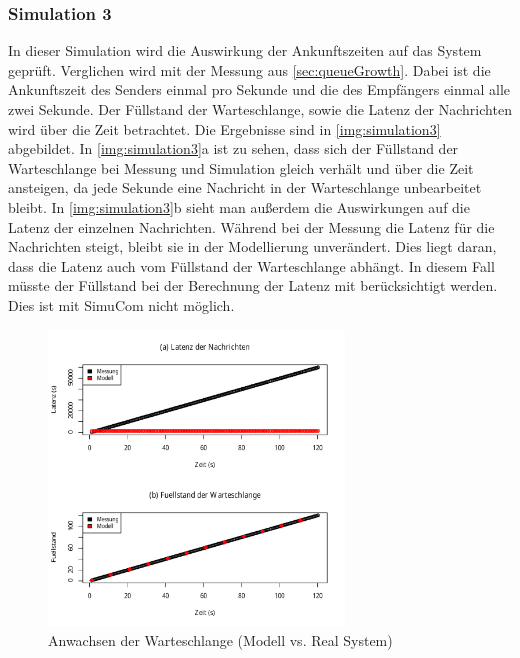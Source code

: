 \subsubsection{Simulation 3}
\label{sec:simulation3}
In dieser Simulation wird die Auswirkung der Ankunftszeiten auf das System geprüft. Verglichen wird mit der Messung aus \autoref{sec:queueGrowth}. Dabei ist die Ankunftszeit des Senders einmal pro Sekunde und die des Empfängers einmal alle zwei Sekunde. Der Füllstand der Warteschlange, sowie die Latenz der Nachrichten wird über die Zeit betrachtet.
Die Ergebnisse sind in \autoref{img:simulation3} abgebildet. In \autoref{img:simulation3}a ist zu sehen, dass sich der Füllstand der Warteschlange bei Messung und Simulation gleich verhält und über die Zeit ansteigen, da jede Sekunde eine Nachricht in der Warteschlange unbearbeitet bleibt. In \autoref{img:simulation3}b sieht man außerdem die Auswirkungen auf die Latenz der einzelnen Nachrichten. Während bei der Messung die Latenz für die Nachrichten steigt, bleibt sie in der Modellierung unverändert. Dies liegt daran, dass die Latenz auch vom Füllstand der Warteschlange abhängt. In diesem Fall müsste der Füllstand bei der Berechnung der Latenz mit berücksichtigt werden. Dies ist mit SimuCom nicht möglich. 
\begin{figure}
\center
  \includegraphics[width=0.7\textwidth]{images/modelSimulationResults/simulation3.pdf}
  \caption{Anwachsen der Warteschlange (Modell vs. Real System)}
  \label{img:simulation3}
\end{figure}

